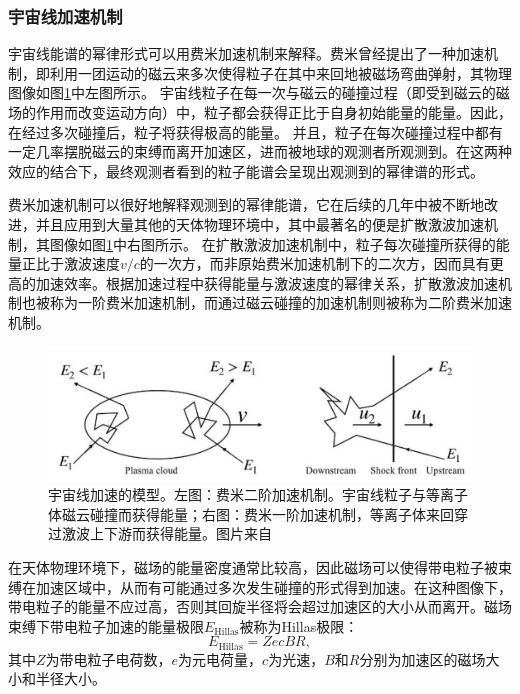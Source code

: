 \subsubsection{宇宙线加速机制}

宇宙线能谱的幂律形式可以用费米加速机制来解释。费米曾经提出了一种加速机制，即利用一团运动的磁云来多次使得粒子在其中来回地被磁场弯曲弹射\cite{Fermi_acceleration:1949}，其物理图像如图\ref{fig:CR_acceration}中左图所示。
宇宙线粒子在每一次与磁云的碰撞过程（即受到磁云的磁场的作用而改变运动方向）中，粒子都会获得正比于自身初始能量的能量。因此，在经过多次碰撞后，粒子将获得极高的能量。
并且，粒子在每次碰撞过程中都有一定几率摆脱磁云的束缚而离开加速区，进而被地球的观测者所观测到。在这两种效应的结合下，最终观测者看到的粒子能谱会呈现出观测到的幂律谱的形式。

费米加速机制可以很好地解释观测到的幂律能谱，它在后续的几年中被不断地改进，并且应用到大量其他的天体物理环境中，其中最著名的便是扩散激波加速机制\cite{Bell_shock_1:1978, Bell_shock_2:1978}，其图像如图\ref{fig:CR_acceration}中右图所示。
在扩散激波加速机制中，粒子每次碰撞所获得的能量正比于激波速度$v/c$的一次方，而非原始费米加速机制下的二次方，因而具有更高的加速效率。根据加速过程中获得能量与激波速度的幂律关系，扩散激波加速机制也被称为一阶费米加速机制，而通过磁云碰撞的加速机制则被称为二阶费米加速机制。

\begin{figure}[htb]
    \centering
    \includegraphics[width=0.8\linewidth]{img/Fermi_acceleration.png}
    \caption{宇宙线加速的模型。左图：费米二阶加速机制。宇宙线粒子与等离子体磁云碰撞而获得能量；右图：费米一阶加速机制，等离子体来回穿过激波上下游而获得能量。图片来自\cite{Gaisser:2016}}
    \label{fig:CR_acceration}
\end{figure}

在天体物理环境下，磁场的能量密度通常比较高，因此磁场可以使得带电粒子被束缚在加速区域中，从而有可能通过多次发生碰撞的形式得到加速。在这种图像下，带电粒子的能量不应过高，否则其回旋半径将会超过加速区的大小从而离开。磁场束缚下带电粒子加速的能量极限$E_\mathrm{Hillas}$被称为Hillas极限\cite{Hillas_limit:1984}：
\begin{equation}
    E_\mathrm{Hillas} = Z e c B R ,
\end{equation}
其中$Z$为带电粒子电荷数，$e$为元电荷量，$c$为光速，$B$和$R$分别为加速区的磁场大小和半径大小。

